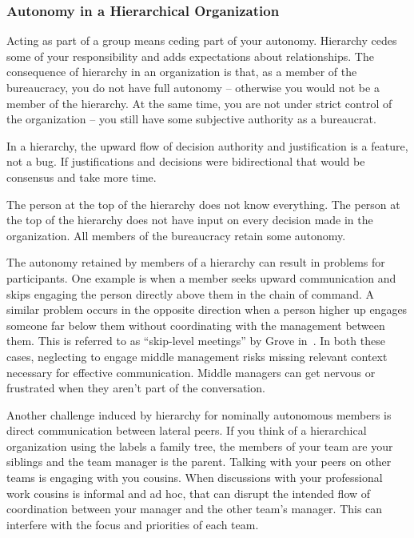 \subsubsection*{Autonomy in a Hierarchical Organization}

Acting as part of a group means ceding part of your autonomy. Hierarchy cedes some of your responsibility and adds expectations about relationships.
The consequence of hierarchy in an organization is that, as a member of the bureaucracy, you do not have full autonomy -- otherwise you would not be a member of the hierarchy. At the same time, you are not under strict control of the organization -- you still have some subjective %
authority as a bureaucrat.


In a hierarchy, the upward flow of decision authority and justification is a feature, not a bug.
If justifications and decisions were bidirectional that would be consensus and take more time.

The person at the top of the hierarchy does not know everything. The person at the top of the hierarchy does not have input on every decision made in the organization. All members of the bureaucracy retain some autonomy.

The autonomy retained by members of a hierarchy can result in problems for participants. 
One example is when a member seeks upward communication and skips engaging the person directly above them in the chain of command. A similar problem occurs in the opposite direction when a person higher up engages someone far below them without coordinating with the management between them. This is referred to as ``skip-level meetings'' by Grove in~\cite{1995_Grove}. In both these cases, neglecting to engage middle management risks missing relevant context necessary for effective communication. Middle managers can get nervous or frustrated when they aren't part of the conversation.

Another challenge induced by hierarchy for nominally autonomous members is direct communication between lateral peers. If you think of a hierarchical organization using the labels a family tree, the members of your team are your siblings and the team manager is the parent. Talking with your peers on other teams is engaging with you cousins. When discussions with your professional work cousins is informal and ad hoc, that can disrupt the intended flow of coordination between your manager and the other team's manager. This can interfere with the focus and priorities of each team. 

